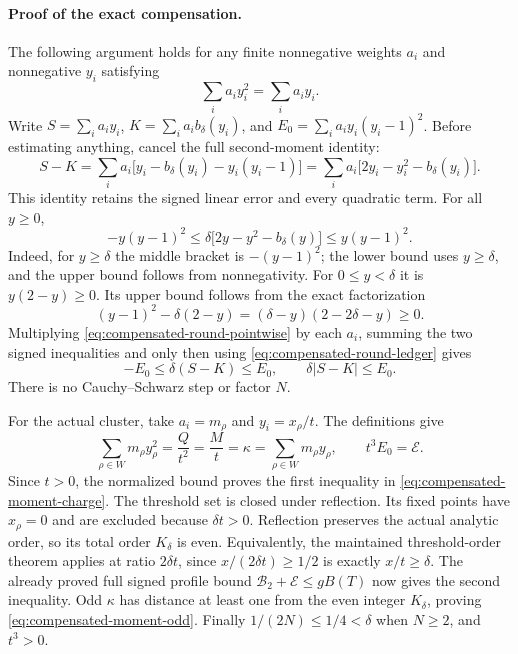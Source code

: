 \paragraph{Proof of the exact compensation.}
The following argument holds for any finite nonnegative weights
\(a_i\) and nonnegative \(y_i\) satisfying
\[
 \sum_i a_i y_i^2=\sum_i a_i y_i.
\]
Write \(S=\sum_i a_i y_i\), \(K=\sum_i a_i b_\delta(y_i)\), and
\(E_0=\sum_i a_i y_i(y_i-1)^2\).  Before estimating anything, cancel
the full second-moment identity:
\begin{equation}
 S-K=\sum_i a_i
 \bigl[y_i-b_\delta(y_i)-y_i(y_i-1)\bigr]
 =\sum_i a_i\bigl[2y_i-y_i^2-b_\delta(y_i)\bigr].
 \label{eq:compensated-round-ledger}
\end{equation}
This identity retains the signed linear error and every quadratic term.
For all \(y\ge0\),
\begin{equation}
 -y(y-1)^2\le
 \delta\bigl[2y-y^2-b_\delta(y)\bigr]\le y(y-1)^2.
 \label{eq:compensated-round-pointwise}
\end{equation}
Indeed, for \(y\ge\delta\) the middle bracket is
\(-(y-1)^2\); the lower bound uses \(y\ge\delta\), and the upper
bound follows from nonnegativity.  For \(0\le y<\delta\) it is
\(y(2-y)\ge0\).  Its upper bound follows from the exact factorization
\[
 (y-1)^2-\delta(2-y)
   =(\delta-y)(2-2\delta-y)\ge0.
\]
Multiplying \eqref{eq:compensated-round-pointwise} by each \(a_i\),
summing the two signed inequalities and only then using
\eqref{eq:compensated-round-ledger} gives
\[
 -E_0\le\delta(S-K)\le E_0,\qquad \delta|S-K|\le E_0.
\]
There is no Cauchy--Schwarz step or factor \(N\).

For the actual cluster, take \(a_i=m_\rho\) and \(y_i=x_\rho/t\).
The definitions give
\[
 \sum_{\rho\in W}m_\rho y_\rho^2
  =\frac Q{t^2}
  =\frac M t
  =\kappa
  =\sum_{\rho\in W}m_\rho y_\rho,
 \qquad t^3E_0=\mathcal E.
\]
Since \(t>0\), the normalized bound proves the first inequality in
\eqref{eq:compensated-moment-charge}.  The threshold set is closed
under reflection.  Its fixed points have \(x_\rho=0\) and are excluded
because \(\delta t>0\).  Reflection preserves the actual analytic
order, so its total order \(K_\delta\) is even.  Equivalently, the
maintained threshold-order theorem applies at ratio \(2\delta t\),
since \(x/(2\delta t)\ge1/2\) is exactly \(x/t\ge\delta\).
The already proved full signed profile bound
\(\mathcal B_2+\mathcal E\le gB(T)\) now gives the second inequality.
Odd \(\kappa\) has distance at least one from the even integer
\(K_\delta\), proving \eqref{eq:compensated-moment-odd}.
Finally \(1/(2N)\le1/4<\delta\) when \(N\ge2\), and \(t^3>0\).

